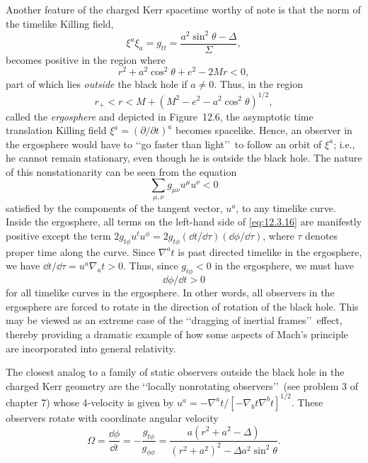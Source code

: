 Another feature of the charged Kerr spacetime worthy of note is that the norm of the
timelike Killing field,
\begin{equation}
 \xi^a\xi_a=g_{tt}=\frac{a^2\sin^2\theta-\Delta}{\Sigma},
 \tag{12.3.13}\label{eq:12.3.13}
\end{equation}
becomes positive in the region where
\begin{equation}
 r^2+a^2\cos^2\theta+e^2-2Mr<0,
 \tag{12.3.14}\label{eq:12.3.14}
\end{equation}
part of which lies \emph{outside} the black hole if \(a\ne0\). Thus, in the region
\begin{equation}
 r_+<r<M+(M^2-e^2-a^2\cos^2\theta)^{1/2},
 \tag{12.3.15}\label{eq:12.3.15}
\end{equation}
called the \emph{ergosphere} and depicted in Figure~12.6, the asymptotic time
translation Killing field \(\xi^a=(\partial/\partial t)^a\) becomes spacelike. Hence,
an observer in the ergosphere would have to \lq\lq go faster than light\rq\rq\ to
follow an orbit of \(\xi^a\); i.e., he cannot remain stationary, even though he is
outside the black hole. The nature of this nonstationarity can be seen from the
equation
\begin{equation}
 \sum_{\mu,\nu}g_{\mu\nu}u^\mu u^\nu<0
 \tag{12.3.16}\label{eq:12.3.16}
\end{equation}
satisfied by the components of the tangent vector, \(u^a\), to any timelike curve.
Inside the ergosphere, all terms on the left-hand side of \eqref{eq:12.3.16} are
manifestly positive except the term
\(2g_{t\phi}u^tu^\phi=2g_{t\phi}(\dd t/\dd\tau)(\dd\phi/\dd\tau)\), where
\(\tau\) denotes proper time along the curve. Since \(\nabla^at\) is past directed
timelike in the ergosphere, we have \(\dd t/\dd\tau=u^a\nabla_at>0\). Thus, since
\(g_{t\phi}<0\) in the ergosphere, we must have
\begin{equation}
 \dd\phi/\dd t>0
 \tag{12.3.17}\label{eq:12.3.17}
\end{equation}
for all timelike curves in the ergosphere. In other words, all observers in the
ergosphere are forced to rotate in the direction of rotation of the black hole. This may
be viewed as an extreme case of the \lq\lq dragging of inertial frames\rq\rq\ effect,
thereby providing a dramatic example of how some aspects of Mach's principle are
incorporated into general relativity.

The closest analog to a family of static observers outside the black hole in the charged
Kerr geometry are the \lq\lq locally nonrotating observers\rq\rq\ (see problem 3 of
chapter 7) whose 4-velocity is given by
\(u^a=-\nabla^at/[-\nabla_bt\nabla^bt]^{1/2}\). These observers rotate with
coordinate angular velocity
\begin{equation}
 \Omega=\frac{\dd\phi}{\dd t}=-\frac{g_{t\phi}}{g_{\phi\phi}}
 =\frac{a(r^2+a^2-\Delta)}{(r^2+a^2)^2-\Delta a^2\sin^2\theta}.
 \tag{12.3.18}\label{eq:12.3.18}
\end{equation}


